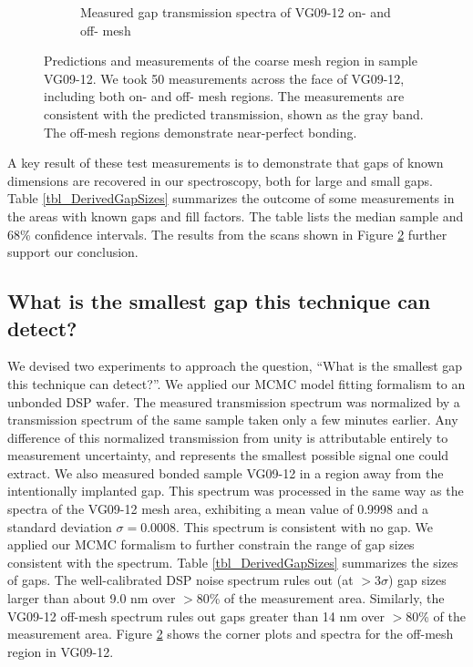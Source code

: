 \documentclass[osajnl,preprint,showpacs,superscriptaddress,12pt]{revtex4-1} %
\begin{document}
\begin{figure}[htbp]
\begin{subfigure}[b]{0.65\textwidth}
        \caption{Measured gap transmission spectra of VG09-12 on- and off- mesh \label{figVG0912}}
    \end{subfigure}
\caption{Predictions and measurements of the coarse mesh region in sample VG09-12.  We took 50 measurements across the face of VG09-12, including both on- and off- mesh regions.  The measurements are consistent with the predicted transmission, shown as the gray band.  The off-mesh regions demonstrate near-perfect bonding.\label{figVG12}}
\end{figure}

A key result of these test measurements is to demonstrate that gaps of known dimensions are recovered in our spectroscopy, both for large and small gaps.  Table \ref{tbl_DerivedGapSizes} summarizes the outcome of some measurements in the areas with known gaps and fill factors.  The table lists the median sample and 68\% confidence intervals.  The results from the scans shown in Figure \ref{figVG12} further support our conclusion.

\subsection{What is the smallest gap this technique can detect?}
We devised two experiments to approach the question, ``What is the smallest gap this technique can detect?''.  We applied our MCMC model fitting formalism to an unbonded DSP wafer.  The measured transmission spectrum was normalized by a transmission spectrum of the same sample taken only a few minutes earlier.  Any difference of this normalized transmission from unity is attributable entirely to measurement uncertainty, and represents the smallest possible signal one could extract.  We also measured bonded sample VG09-12 in a region away from the intentionally implanted gap.  This spectrum was processed in the same way as the spectra of the VG09-12 mesh area, exhibiting a mean value of 0.9998 and a standard deviation $\sigma=0.0008$.  This spectrum is consistent with no gap.  We applied our MCMC formalism to further constrain the range of gap sizes consistent with the spectrum.  Table \ref{tbl_DerivedGapSizes} summarizes the sizes of gaps.  The well-calibrated DSP noise spectrum rules out (at $>3\sigma$) gap sizes larger than about 9.0 nm over $>80$\% of the measurement area.  Similarly, the VG09-12 off-mesh spectrum rules out gaps greater than 14 nm over $>80$\% of the measurement area.  Figure \ref{figVG12} shows the corner plots and spectra for the off-mesh region in VG09-12.
\end{document}
